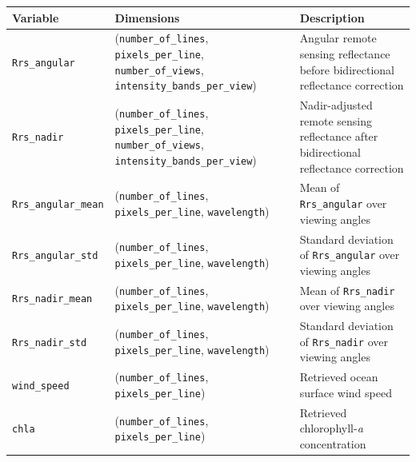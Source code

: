 \documentclass[
  11pt,
  letterpaper,
]{scrreprt}
\begin{document}
\begin{longtable}[]{@{}
  >{\raggedright\arraybackslash}p{}
  >{\raggedright\arraybackslash}p{}
  >{\raggedright\arraybackslash}p{}@{}}
\toprule\noalign{}
\begin{minipage}[b]{\linewidth}\raggedright
Variable
\end{minipage} & \begin{minipage}[b]{\linewidth}\raggedright
Dimensions
\end{minipage} & \begin{minipage}[b]{\linewidth}\raggedright
Description
\end{minipage} \\
\midrule\noalign{}
\endhead
\bottomrule\noalign{}
\endlastfoot
\texttt{Rrs\_angular} & (\texttt{number\_of\_lines},
\texttt{pixels\_per\_line}, \texttt{number\_of\_views},
\texttt{intensity\_bands\_per\_view}) & Angular remote sensing
reflectance before bidirectional reflectance correction \\
\texttt{Rrs\_nadir} & (\texttt{number\_of\_lines},
\texttt{pixels\_per\_line}, \texttt{number\_of\_views},
\texttt{intensity\_bands\_per\_view}) & Nadir-adjusted remote sensing
reflectance after bidirectional reflectance correction \\
\texttt{Rrs\_angular\_mean} & (\texttt{number\_of\_lines},
\texttt{pixels\_per\_line}, \texttt{wavelength}) & Mean of
\texttt{Rrs\_angular} over viewing angles \\
\texttt{Rrs\_angular\_std} & (\texttt{number\_of\_lines},
\texttt{pixels\_per\_line}, \texttt{wavelength}) & Standard deviation of
\texttt{Rrs\_angular} over viewing angles \\
\texttt{Rrs\_nadir\_mean} & (\texttt{number\_of\_lines},
\texttt{pixels\_per\_line}, \texttt{wavelength}) & Mean of
\texttt{Rrs\_nadir} over viewing angles \\
\texttt{Rrs\_nadir\_std} & (\texttt{number\_of\_lines},
\texttt{pixels\_per\_line}, \texttt{wavelength}) & Standard deviation of
\texttt{Rrs\_nadir} over viewing angles \\
\texttt{wind\_speed} & (\texttt{number\_of\_lines},
\texttt{pixels\_per\_line}) & Retrieved ocean surface wind speed \\
\texttt{chla} & (\texttt{number\_of\_lines}, \texttt{pixels\_per\_line})
& Retrieved chlorophyll-\emph{a} concentration \\
\end{longtable}
\end{document}
